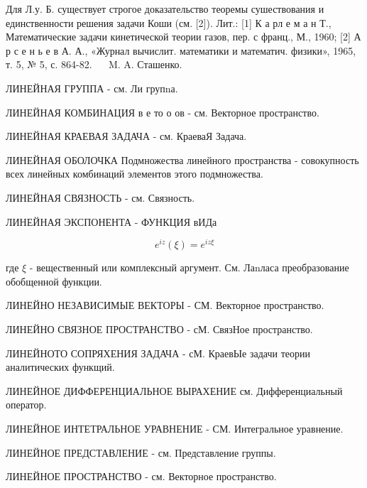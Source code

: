 \documentclass[10pt]{article}
\begin{document}
Для Л.у. Б. существует строгое доказательство теоремы сушествования и единственности решения задачи Коши (см. [2]). Лит.: [1] К а рл е м а н Т., Математические задачи кинетической теории газов, пер. с франц., М., 1960; [2] А р с е н ь е в А. А., «Журнал вычислит. математики и математич. физики», 1965, т. 5, № 5, с. 864-82. $\quad$ M. A. Сташенко.



ЛИНЕЙНАЯ ГРУППА - см. Ли групnа.



ЛИНЕЙНАЯ КОМБИНАЦИЯ в е то о ов - см. Векторное пространство.



ЛИНЕЙНАЯ КРАЕВАЯ ЗАДАЧА - см. КраеваЯ Задача.



ЛИНЕЙНАЯ ОБОЛОЧКА Подмножества линейного пространства - совокупность всех линейных комбинаций элементов этого подмножества.



ЛИНЕЙНАЯ СВЯЗНОСТЬ - см. Связность.



ЛИНЕЙНАЯ ЭКСПОНЕНТА - ФУНКЦИЯ вИДа



\[

e^{i z}(\xi)=e^{i z \xi}

\]



где $\xi$ - вещественный или комплексный аргумент. См. Лаnласа преобразование обобщенной функции.



ЛИНЕЙНО НЕЗАВИСИМЫЕ ВЕКТОРЫ - СМ. Векторное пространство.



ЛИНЕЙНО СВЯЗНОЕ ПРОСТРАНСТВО - сМ. СвязНое пространство.



ЛИНЕЙНОТО СОПРЯХЕНИЯ ЗАДАЧА - сМ. КраевЫе задачи теории аналитических функщий.



ЛИНЕЙНОЕ ДИФФЕРЕНЦИАЛЬНОЕ ВЫРАХЕНИЕ см. Дифференциальный оператор.



ЛИНЕЙНОЕ ИНТЕТРАЛЬНОЕ УРАВНЕНИЕ - СМ. Интегральное уравнение.



ЛИНЕЙНОЕ ПРЕДСТАВЛЕНИЕ - см. Представление группы.



ЛИНЕЙНОЕ ПРОСТРАНСТВО - см. Векторное пространство.
\end{document}
